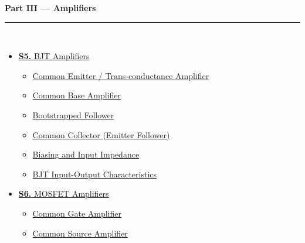 \documentclass[12pt,a3paper]{article}
\begin{document}
\begin{tcolorbox}[breakable,colback=cC!5,colframe=cC,boxrule=1pt,arc=5pt,
  left=8pt,right=8pt,top=8pt,bottom=8pt,before skip=4pt]
  {\large\bfseries\textcolor{cC}{Part III --- Amplifiers}}\\[5pt]
  \textcolor{cC!40}{\rule{\textwidth}{0.4pt}}\\[3pt]
  \small\begin{itemize}[leftmargin=1.2em,itemsep=1pt,label={\textcolor{cC}{$\triangleright$}}]
    \item \hyperref[sec:S5]{\textbf{S5.} BJT Amplifiers}
      \begin{itemize}[leftmargin=1.5em,itemsep=0pt,label={\textcolor{cC}{$\cdot$}}]
        \item \hyperref[sub:s5-ce]{Common Emitter / Trans-conductance Amplifier}
        \item \hyperref[sub:s5-cb]{Common Base Amplifier}
        \item \hyperref[sub:s5-bootstrap]{Bootstrapped Follower}
        \item \hyperref[sub:s5-cc]{Common Collector (Emitter Follower)}
        \item \hyperref[sub:s5-biasimpedance]{Biasing and Input Impedance}
        \item \hyperref[sub:s5-io]{BJT Input-Output Characteristics}
      \end{itemize}
    \item \hyperref[sec:S6]{\textbf{S6.} MOSFET Amplifiers}
      \begin{itemize}[leftmargin=1.5em,itemsep=0pt,label={\textcolor{cC}{$\cdot$}}]
        \item \hyperref[sub:s6-cg]{Common Gate Amplifier}
        \item \hyperref[sub:s6-cs]{Common Source Amplifier}
      \end{itemize}
  \end{itemize}
\end{tcolorbox}

\vspace{6pt}
\end{document}
